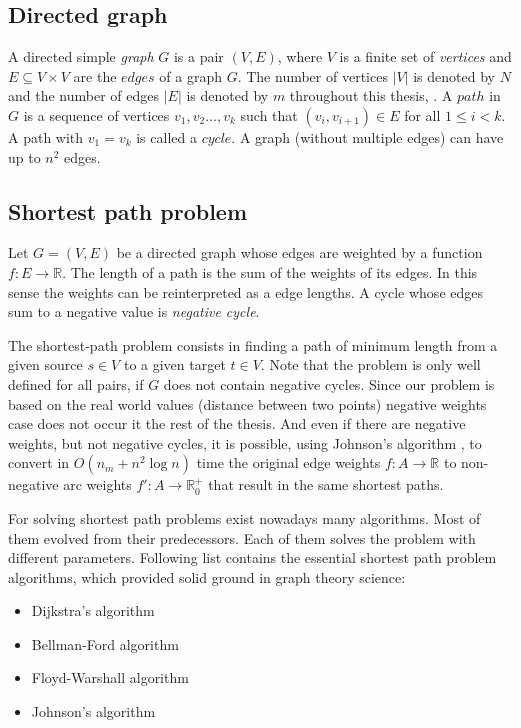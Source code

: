 \documentclass[thesis=M,english]{FITthesis}[2012/10/20]
\begin{document}
\subsection{Directed graph}
A directed simple \textit{graph} $G$ is a pair $(V, E)$, where $V$ is a finite set of \textit{vertices} and $E \subseteq V \times V$ are the $edges$ of a graph $G$. The number of vertices $|V|$ is denoted by $N$ and the number of edges $|E|$ is denoted by $m$ throughout this thesis, . A $path$ in $G$ is a sequence of vertices $v_1, v_2 \dots ,v_k$ such that $(v_i,v_{i+1}) \in E$ for all $1 \leq i < k$. A path with $v_1 = v_k$ is called a $cycle$. A graph (without multiple edges) can have up to $n^2$ edges. 


\subsection{Shortest path problem}
\label{sec:SPP}
Let $G = (V, E)$ be a directed graph whose edges are weighted by a function $f: E \to \mathbb{R}$. 
The length of a path is the sum of the weights of its edges. In this sense the weights can be reinterpreted as a edge lengths. A cycle whose edges sum to a negative value is \textit{negative cycle}.  

The shortest-path problem consists in finding a path of minimum length from a given source $s \in V$ to a given target $t \in V$.
Note that the problem is only well defined for all pairs, if $G$ does not contain negative cycles.
Since our problem is based on the real world values (distance between two points) negative weights case does not occur it the rest of the thesis.
And even if there are negative weights, but not negative cycles, it is possible, using Johnson's algorithm \cite{Johnson77}, to convert in $O(n_m + n^2 \log n)$ time the original edge weights $f: A \to \mathbb{R}$ to non-negative arc weights $ f': A \to \mathbb{R}^+_0$ that result in the same shortest paths.

For solving shortest path problems exist nowadays many algorithms. Most of them evolved from their predecessors. Each of them solves the problem with different parameters. 
Following list contains the essential shortest path problem algorithms, which provided solid ground in graph theory science:
\begin{itemize}
\item Dijkstra's algorithm
\item Bellman-Ford algorithm
\item Floyd-Warshall algorithm
\item Johnson's algorithm 
\end{itemize}
\end{document}
